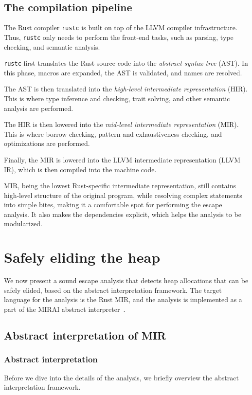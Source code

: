 \documentclass[en]{snu-ece-bsc-thesis}
\theoremstyle{definition}
\begin{document}
\section{The compilation pipeline}
The Rust compiler \verb/rustc/ is built on top of the LLVM compiler infrastructure.
Thus, \verb/rustc/ only needs to perform the front-end tasks, such as parsing, type checking, and semantic analysis.

\verb/rustc/ first translates the Rust source code into the \emph{abstract syntax tree} (AST).
In this phase, macros are expanded, the AST is validated, and names are resolved.

The AST is then translated into the \emph{high-level intermediate representation} (HIR).
This is where type inference and checking, trait solving, and other semantic analysis are performed.

The HIR is then lowered into the \emph{mid-level intermediate representation} (MIR).
This is where borrow checking, pattern and exhaustiveness checking, and optimizations are performed.

Finally, the MIR is lowered into the LLVM intermediate representation (LLVM IR), which is then compiled into the machine code.

MIR, being the lowest Rust-specific intermediate representation, still contains high-level structure of the original program, while resolving complex statements into simple bites, making it a comfortable spot for performing the escape analysis.
It also makes the dependencies explicit, which helps the analysis to be modularized.


\chapter{Safely eliding the heap}\label{chap:eliding-heap-allocations}

We now present a sound escape analysis that detects heap allocations that can be safely elided, based on the abstract interpretation framework.
The target language for the analysis is the Rust MIR, and the analysis is implemented as a part of the MIRAI abstract interpreter~\cite{mirai}.


\section{Abstract interpretation of MIR}
\subsection{Abstract interpretation}
Before we dive into the details of the analysis, we briefly overview the abstract interpretation framework.
\end{document}
